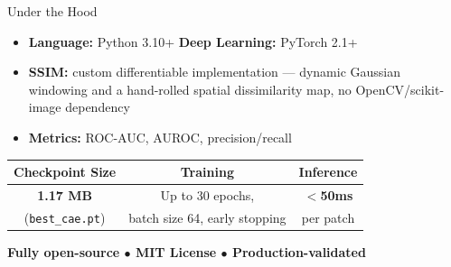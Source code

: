 \documentclass[aspectratio=169, 11pt]{beamer}
\newcommand{\emphred}[1]{\textcolor{secondary}{#1}}
\begin{document}
\begin{frame}{\emphred{Under the Hood}}
    \begin{itemize}
        \item \textbf{Language:} Python 3.10+ \quad\textbar\quad \textbf{Deep Learning:} PyTorch 2.1+
        \item \textbf{SSIM:} custom differentiable implementation --- dynamic Gaussian windowing and a hand-rolled spatial dissimilarity map, no OpenCV/scikit-image dependency
        \item \textbf{Metrics:} ROC-AUC, AUROC, precision/recall
    \end{itemize}

    \vspace{0.7cm}
    \begin{center}
        \begin{tabular}{|c|c|c|}
            \hline
            \textbf{Checkpoint Size} & \textbf{Training} & \textbf{Inference} \\
            \hline
            \textbf{\emphred{1.17 MB}} & Up to 30 epochs, & \textbf{\emphred{$<$50ms}} \\
            (\texttt{best\_cae.pt}) & batch size 64, early stopping & per patch \\
            \hline
        \end{tabular}
    \end{center}

    \vspace{0.7cm}
    \begin{center}
        \textbf{\small Fully open-source $\bullet$ MIT License $\bullet$ Production-validated}
    \end{center}
\end{frame}
\end{document}
